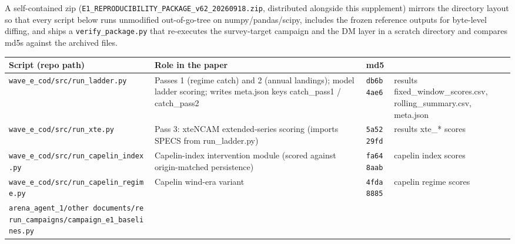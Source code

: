 \documentclass[11pt]{article}
\begin{document}
A self-contained zip
(\texttt{E1\_REPRODUCIBILITY\_PACKAGE\_v62\_20260918.zip}, distributed
alongside this supplement) mirrors the directory layout so that every
script below runs unmodified out-of-go-tree on numpy/pandas/scipy,
includes the frozen reference outputs for byte-level diffing, and ships
a \texttt{verify\_package.py} that re-executes the survey-target
campaign and the DM layer in a scratch directory and compares md5s
against the archived files.

{\def\LTcaptype{none} %
\begin{longtable}[]{@{}
  >{\raggedright\arraybackslash}p{}
  >{\raggedright\arraybackslash}p{}
  >{\raggedright\arraybackslash}p{}
  >{\raggedright\arraybackslash}p{}@{}}
\toprule\noalign{}
\begin{minipage}[b]{\linewidth}\raggedright
Script (repo path)
\end{minipage} & \begin{minipage}[b]{\linewidth}\raggedright
Role in the paper
\end{minipage} & \begin{minipage}[b]{\linewidth}\raggedright
md5
\end{minipage} & \begin{minipage}[b]{\linewidth}\raggedright
\end{minipage} \\
\midrule\noalign{}
\endhead
\bottomrule\noalign{}
\endlastfoot
\texttt{wave\_e\_cod/src/run\_ladder.py} & Passes 1 (regime catch) and 2
(annual landings); model ladder scoring; writes meta.json keys
catch\_pass1 / catch\_pass2 & \texttt{db6b4ae6} & results
fixed\_window\_scores.csv, rolling\_summary.csv, meta.json \\
\texttt{wave\_e\_cod/src/run\_xte.py} & Pass 3: xteNCAM extended-series
scoring (imports SPECS from run\_ladder.py) & \texttt{5a5229fd} &
results xte\_* scores \\
\texttt{wave\_e\_cod/src/run\_capelin\_index.py} & Capelin-index
intervention module (scored against origin-matched persistence) &
\texttt{fa648aab} & capelin index scores \\
\texttt{wave\_e\_cod/src/run\_capelin\_regime.py} & Capelin wind-era
variant & \texttt{4fda8885} & capelin regime scores \\
\texttt{arena\_agent\_1/other\ documents/rerun\_campaigns/campaign\_e1\_baselines.py}

\end{longtable}}
\end{document}
